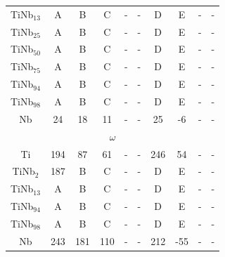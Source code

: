 \begin{longtable}[H]{ c c c c c c c c c c }
	TiNb$_{13}$ & A & B & C & - & - & D & E & - & - \\
	TiNb$_{25}$ & A & B & C & - & - & D & E & - & - \\
	TiNb$_{50}$ & A & B & C & - & - & D & E & - & - \\
	TiNb$_{75}$ & A & B & C & - & - & D & E & - & - \\
	TiNb$_{94}$ & A & B & C & - & - & D & E & - & - \\
	TiNb$_{98}$ & A & B & C & - & - & D & E & - & - \\
	Nb & 24 & 18 & 11 & - & - & 25 & -6 & - & - \\
	\hline
	\multicolumn{10}{c}{$\omega$}\\
	Ti & 194 & 87 & 61 & - & - & 246 & 54 & - & - \\
	TiNb$_{2}$ & 187 & B & C & - & - & D & E & - & - \\
	TiNb$_{13}$ & A & B & C & - & - & D & E & - & - \\
	TiNb$_{94}$ & A & B & C & - & - & D & E & - & - \\
	TiNb$_{98}$ & A & B & C & - & - & D & E & - & - \\
	Nb & 243 & 181 & 110 & - & - & 212 & -55 & - & - \\
	\hline
\end{longtable}

